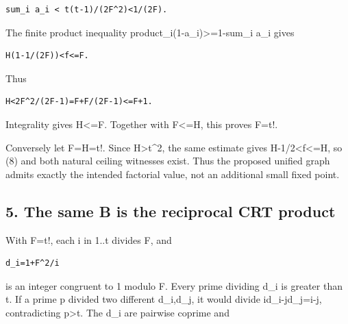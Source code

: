 \begin{verbatim}
sum_i a_i < t(t-1)/(2F^2)<1/(2F).
\end{verbatim}

The finite product inequality product\_\allowbreak{}i(1-a\_\allowbreak{}i)\textgreater{}\allowbreak{}=\allowbreak{}1-sum\_\allowbreak{}i a\_\allowbreak{}i gives



\begin{verbatim}
H(1-1/(2F))<f<=F.
\end{verbatim}

Thus



\begin{verbatim}
H<2F^2/(2F-1)=F+F/(2F-1)<=F+1.
\end{verbatim}

Integrality gives H\textless{}\allowbreak{}=\allowbreak{}F. Together with F\textless{}\allowbreak{}=\allowbreak{}H, this proves F=\allowbreak{}t!.



Conversely let F=\allowbreak{}H=\allowbreak{}t!. Since H\textgreater{}\allowbreak{}t\textasciicircum{}\allowbreak{}2, the same estimate gives H-1/\allowbreak{}2\textless{}\allowbreak{}f\textless{}\allowbreak{}=\allowbreak{}H, so (8) and both natural ceiling witnesses exist. Thus the proposed unified graph admits exactly the intended factorial value, not an additional small fixed point.



\subsection*{5. The same B is the reciprocal CRT product}



With F=\allowbreak{}t!, each i in 1..t divides F, and



\begin{verbatim}
d_i=1+F^2/i
\end{verbatim}

is an integer congruent to 1 modulo F. Every prime dividing d\_\allowbreak{}i is greater than t. If a prime p divided two different d\_\allowbreak{}i,d\_\allowbreak{}j, it would divide i\textasteriskcentered{}\allowbreak{}d\_\allowbreak{}i-j\textasteriskcentered{}\allowbreak{}d\_\allowbreak{}j=\allowbreak{}i-j, contradicting p\textgreater{}\allowbreak{}t. The d\_\allowbreak{}i are pairwise coprime and



